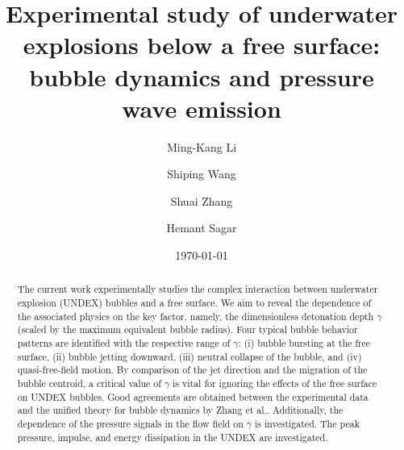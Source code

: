\documentclass[%
 aip,
 amsmath,amssymb,
 reprint,%
]{revtex4-1}
\begin{document}

\title{Experimental study of underwater explosions below a free surface: bubble dynamics and pressure wave emission}
\author{Ming-Kang Li}


\author{Shiping Wang} 
%
\author{Shuai Zhang}
\author{ Hemant Sagar}


\date{\today}%

\begin{abstract}
	The current work experimentally studies the complex interaction between underwater explosion (UNDEX) bubbles and a free surface. We aim to reveal the dependence of the associated physics on the key factor, namely, the dimensionless detonation depth $\gamma$ (scaled by the maximum equivalent bubble radius). Four typical bubble behavior patterns are identified with the respective range of $\gamma$: (i) bubble bursting at the free surface, (ii) bubble jetting downward, (iii) neutral collapse of the bubble, and (iv) quasi-free-field motion. {By comparison of the jet direction and the migration of the bubble centroid, a critical value of $\gamma$ is vital for ignoring the effects of the free surface on UNDEX bubbles.} Good agreements are obtained between the experimental data and the unified theory for bubble dynamics by Zhang et al.\cite{RN3019}. Additionally, the dependence of the pressure signals in the flow field on  $\gamma$ is investigated. The peak pressure, impulse, and energy dissipation in the UNDEX are investigated. 
\end{abstract}

\maketitle
\end{document}
